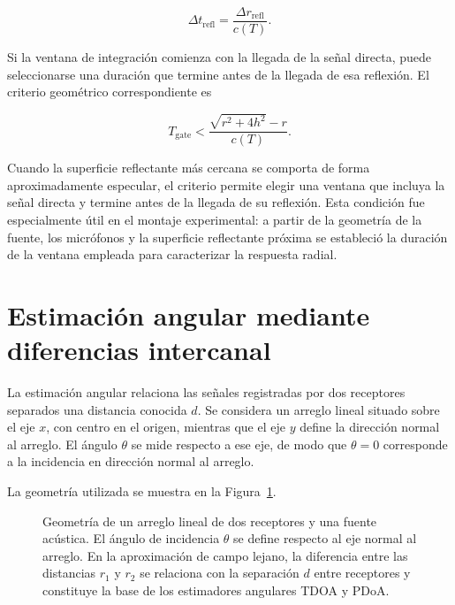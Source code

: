 \begin{equation}
    \Delta t_{\mathrm{refl}} =
    \frac{\Delta r_{\mathrm{refl}}}{c(T)}.
    \label{eq:delta_t_refl}
\end{equation}

Si la ventana de integración comienza con la llegada de la señal
directa, puede seleccionarse una duración que termine antes de la
llegada de esa reflexión. El criterio geométrico correspondiente es

\begin{equation}
    T_{\mathrm{gate}} <
    \frac{\sqrt{r^2+4h^2}-r}{c(T)}.
    \label{eq:criterio_corte_anecoico}
\end{equation}

Cuando la superficie reflectante más cercana se comporta de forma
aproximadamente especular, el criterio permite elegir una ventana que
incluya la señal directa y termine antes de la llegada de su reflexión.
Esta condición fue especialmente útil en el montaje experimental:
a partir de la geometría de la fuente, los micrófonos y la superficie
reflectante próxima se estableció la duración de la ventana empleada
para caracterizar la respuesta radial.

\section{Estimación angular mediante diferencias intercanal}

La estimación angular relaciona las señales registradas por dos
receptores separados una distancia conocida $d$. Se considera un
arreglo lineal situado sobre el eje $x$, con centro en el origen,
mientras que el eje $y$ define la dirección normal al arreglo. El
ángulo $\theta$ se mide respecto a ese eje, de modo que $\theta=0$
corresponde a la incidencia en dirección normal al arreglo.

La geometría utilizada se muestra en la
Figura~\ref{fig:geometria_2d_angular}.

\begin{figure}[!htbp]
    \centering
    
    \vspace{0.25cm}
    \caption{Geometría de un arreglo lineal de dos receptores
    y una fuente acústica. El ángulo de incidencia $\theta$ se
    define respecto al eje normal al arreglo. En la aproximación
    de campo lejano, la diferencia entre las distancias $r_1$
    y $r_2$ se relaciona con la separación $d$ entre receptores
    y constituye la base de los estimadores angulares TDOA y PDoA.}
    \label{fig:geometria_2d_angular}
\end{figure}

